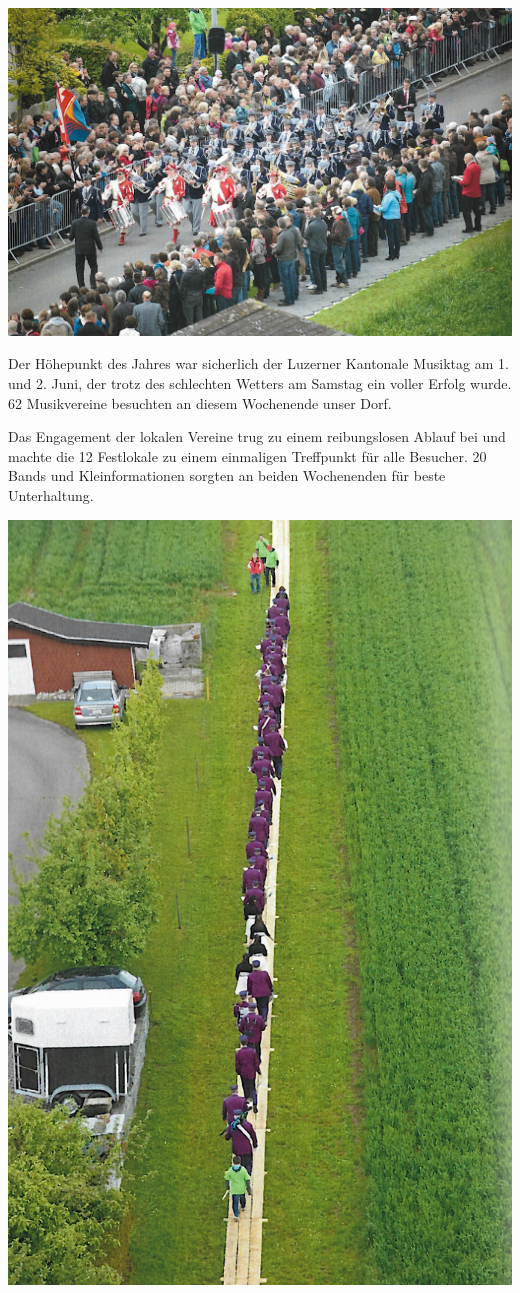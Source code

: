 \begin{history}
    \begin{MulticolFigure}
        \centering
        \includegraphics[width=0.93\linewidth]{./chap/2001-2024/2013/Marschmusikstrecke.jpg}
    \end{MulticolFigure}

    Der Höhepunkt des Jahres war sicherlich der Luzerner Kantonale Musiktag am
    1. und 2. Juni, der trotz des schlechten Wetters am Samstag ein voller
    Erfolg wurde. 62 Musikvereine besuchten an diesem Wochenende unser Dorf.

    Das Engagement der lokalen Vereine trug zu einem reibungslosen Ablauf bei
    und machte die 12 Festlokale zu einem einmaligen Treffpunkt für alle
    Besucher. 20 Bands und Kleinformationen sorgten an beiden Wochenenden für
    beste Unterhaltung.

    \begin{MulticolFigure}
        \centering
        \includegraphics[width=0.6\linewidth]{./chap/2001-2024/2013/Unterwegs-zum-Start.jpg}
    \end{MulticolFigure}



\end{history}
